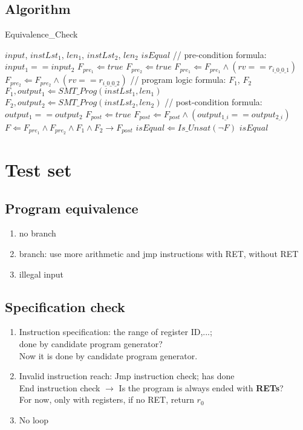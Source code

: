 \documentclass{article}
\begin{document}
\subsection{Algorithm}
\begin{algorithm}
\begin{algorithmic}[1]
\caption{Equivalence\_Check}
\REQUIRE $input$, $instLst_1$, $len_1$, $instLst_2$, $len_2$
\ENSURE $isEqual$
\STATE // pre-condition formula: $input_1 == input_2$
\STATE $F_{pre_1} \Leftarrow true$
\STATE $F_{pre_2} \Leftarrow true$
\STATE $F_{pre_1} \Leftarrow F_{pre_1} \wedge (rv == r_{i\_0\_0\_1})$
\STATE $F_{pre_2} \Leftarrow F_{pre_2} \wedge (rv == r_{i\_0\_0\_2})$
\ENDFOR{}
\STATE // program logic formula: $F_1$, $F_2$
\STATE $F_1, output_1 \Leftarrow SMT\_Prog(instLst_1, len_1)$
\STATE $F_2, output_2 \Leftarrow SMT\_Prog(instLst_2, len_2)$
\STATE // post-condition formula: $output_1 == output_2$
\STATE $F_{post} \Leftarrow true$
\STATE $F_{post} \Leftarrow F_{post} \wedge (output_{1\_i} == output_{2\_i})$
\ENDFOR
\STATE $F \Leftarrow F_{pre_1} \wedge F_{pre_2} \wedge F_1 \wedge F_2 \rightarrow F_{post} $
\STATE $isEqual \Leftarrow Is\_Unsat(\neg F)$
\RETURN $isEqual$
\end{algorithmic}
\end{algorithm}

\section{Test set}
\subsection{Program equivalence}
\begin{enumerate}
\item no branch
\item branch: use more arithmetic and jmp instructions 
\subitem with RET, 
\subitem without RET
\item illegal input
\end{enumerate}
\subsection{Specification check} 

\begin{enumerate}
\item Instruction specification: the range of register ID,...; \\done by candidate program generator?\\
Now it is done by candidate program generator.
\item Invalid instruction reach: Jmp instruction check; has done\\ 
End instruction check  $\rightarrow$ Is the program is always ended with \textbf{RETs}? \\
For now, only with registers, if no RET, return $r_0$  
\item No loop
\end{enumerate}
\end{document}
